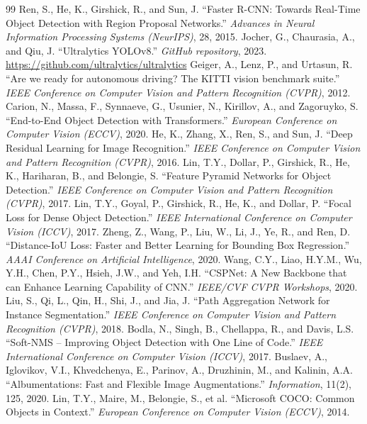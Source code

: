 \documentclass[a4paper]{article}
\theoremstyle{definition}
\begin{document}
\begin{thebibliography}{99}
	 Ren, S., He, K., Girshick, R., and Sun, J. ``Faster R-CNN: Towards Real-Time Object Detection with Region Proposal Networks.'' \textit{Advances in Neural Information Processing Systems (NeurIPS)}, 28, 2015.
	 Jocher, G., Chaurasia, A., and Qiu, J. ``Ultralytics YOLOv8.'' \textit{GitHub repository}, 2023. \url{https://github.com/ultralytics/ultralytics}
	 Geiger, A., Lenz, P., and Urtasun, R. ``Are we ready for autonomous driving? The KITTI vision benchmark suite.'' \textit{IEEE Conference on Computer Vision and Pattern Recognition (CVPR)}, 2012.
	 Carion, N., Massa, F., Synnaeve, G., Usunier, N., Kirillov, A., and Zagoruyko, S. ``End-to-End Object Detection with Transformers.'' \textit{European Conference on Computer Vision (ECCV)}, 2020.
	 He, K., Zhang, X., Ren, S., and Sun, J. ``Deep Residual Learning for Image Recognition.'' \textit{IEEE Conference on Computer Vision and Pattern Recognition (CVPR)}, 2016.
	 Lin, T.Y., Dollar, P., Girshick, R., He, K., Hariharan, B., and Belongie, S. ``Feature Pyramid Networks for Object Detection.'' \textit{IEEE Conference on Computer Vision and Pattern Recognition (CVPR)}, 2017.
	 Lin, T.Y., Goyal, P., Girshick, R., He, K., and Dollar, P. ``Focal Loss for Dense Object Detection.'' \textit{IEEE International Conference on Computer Vision (ICCV)}, 2017.
	 Zheng, Z., Wang, P., Liu, W., Li, J., Ye, R., and Ren, D. ``Distance-IoU Loss: Faster and Better Learning for Bounding Box Regression.'' \textit{AAAI Conference on Artificial Intelligence}, 2020.
	 Wang, C.Y., Liao, H.Y.M., Wu, Y.H., Chen, P.Y., Hsieh, J.W., and Yeh, I.H. ``CSPNet: A New Backbone that can Enhance Learning Capability of CNN.'' \textit{IEEE/CVF CVPR Workshops}, 2020.
	 Liu, S., Qi, L., Qin, H., Shi, J., and Jia, J. ``Path Aggregation Network for Instance Segmentation.'' \textit{IEEE Conference on Computer Vision and Pattern Recognition (CVPR)}, 2018.
	 Bodla, N., Singh, B., Chellappa, R., and Davis, L.S. ``Soft-NMS -- Improving Object Detection with One Line of Code.'' \textit{IEEE International Conference on Computer Vision (ICCV)}, 2017.
	 Buslaev, A., Iglovikov, V.I., Khvedchenya, E., Parinov, A., Druzhinin, M., and Kalinin, A.A. ``Albumentations: Fast and Flexible Image Augmentations.'' \textit{Information}, 11(2), 125, 2020.
	 Lin, T.Y., Maire, M., Belongie, S., et al. ``Microsoft COCO: Common Objects in Context.'' \textit{European Conference on Computer Vision (ECCV)}, 2014.
\end{thebibliography}
\end{document}
